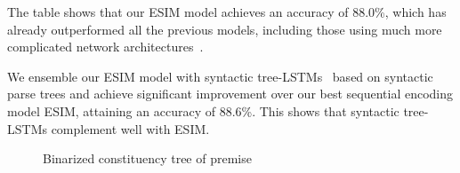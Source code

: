 \documentclass[11pt,a4paper]{article}
\begin{document}
The table shows that our ESIM model achieves an accuracy of 88.0\%, which has already outperformed all the previous models, including those using much more complicated network architectures~\citep{DBLP:journals/corr/MunkhdalaiY16b}. 

We ensemble our ESIM model with syntactic tree-LSTMs~\citep{DBLP:conf/icml/ZhuSG15} based on syntactic parse trees and achieve significant improvement over our best sequential encoding model ESIM, attaining an accuracy of 88.6\%. This shows that syntactic tree-LSTMs complement well with ESIM. 

\begin{figure*}[!ht]
	\centering
	\begin{subfigure}[b]{1\textwidth}
		\centering
		\caption{Binarized constituency tree of premise}
		\label{fig:tree_premise}
	\end{subfigure}
	~ \begin{subfigure}[b]{0.58\textwidth}
		\centering
\end{subfigure}
\end{figure*}
\end{document}
